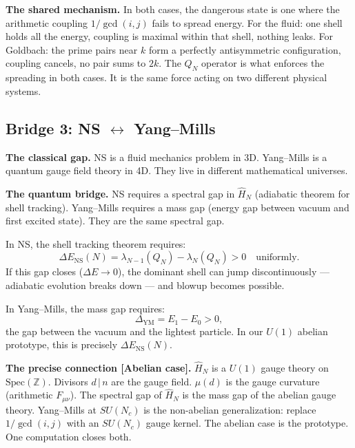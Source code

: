 \documentclass[12pt]{article}
\begin{document}
\textbf{The shared mechanism.}
In both cases, the dangerous state is one where the
arithmetic coupling $1/\gcd(i,j)$ fails to spread energy.
For the fluid: one shell holds all the energy, coupling is maximal
within that shell, nothing leaks.
For Goldbach: the prime pairs near $k$ form a perfectly
antisymmetric configuration, coupling cancels, no pair sums to $2k$.
The $Q_N$ operator is what enforces the spreading in both cases.
It is the same force acting on two different physical systems.

\subsection{Bridge 3: NS $\longleftrightarrow$ Yang--Mills}
\label{sec:bridge-ym}

\textbf{The classical gap.}
NS is a fluid mechanics problem in 3D.
Yang--Mills is a quantum gauge field theory in 4D.
They live in different mathematical universes.

\textbf{The quantum bridge.}
NS requires a spectral gap in $\hat{H}_N$ (adiabatic theorem for shell tracking).
Yang--Mills requires a mass gap (energy gap between vacuum and first excited state).
They are the same spectral gap.

\medskip
In NS, the shell tracking theorem requires:
\[
  \Delta E_{\mathrm{NS}}(N)
  = \lambda_{N-1}(Q_N) - \lambda_N(Q_N) > 0 \quad\text{uniformly.}
\]
If this gap closes ($\Delta E \to 0$), the dominant shell can jump
discontinuously --- adiabatic evolution breaks down --- and blowup
becomes possible.

In Yang--Mills, the mass gap requires:
\[
  \Delta_{\mathrm{YM}} = E_1 - E_0 > 0,
\]
the gap between the vacuum and the lightest particle.
In our $U(1)$ abelian prototype, this is precisely $\Delta E_{\mathrm{NS}}(N)$.

\begin{tcolorbox}[keybox]
\textbf{The precise connection [Abelian case].}
$\hat{H}_N$ is a $U(1)$ gauge theory on $\mathrm{Spec}(\mathbb{Z})$.
Divisors $d\,|\,n$ are the gauge field.
$\mu(d)$ is the gauge curvature (arithmetic $F_{\mu\nu}$).
The spectral gap of $\hat{H}_N$ is the mass gap of the abelian gauge theory.
Yang--Mills at $SU(N_c)$ is the non-abelian generalization:
replace $1/\gcd(i,j)$ with an $SU(N_c)$ gauge kernel.
The abelian case is the prototype.
One computation closes both.
\end{tcolorbox}
\end{document}
